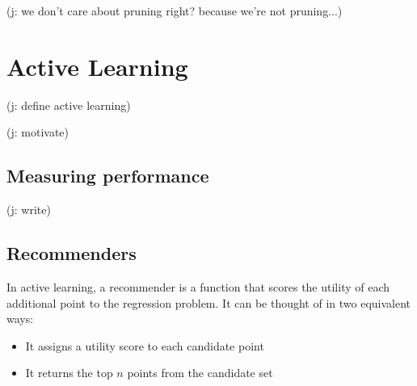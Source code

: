\documentclass[11pt,twoside]{report}
\newcommand\jakub[1]{{\color{red}(j: #1)}}
\begin{document}
\jakub{we don't care about pruning right? because we're not pruning...}

\chapter{Active Learning}

\jakub{define active learning}

\jakub{motivate}

\section{Measuring performance}

\jakub{write}

\section{Recommenders}

In active learning, a recommender is a function that scores the utility of each additional point to the regression problem. It can be thought of in two equivalent ways:\begin{itemize}
    \item It assigns a utility score to each candidate point
    \item It returns the top $n$ points from the candidate set
\end{itemize}
\end{document}
